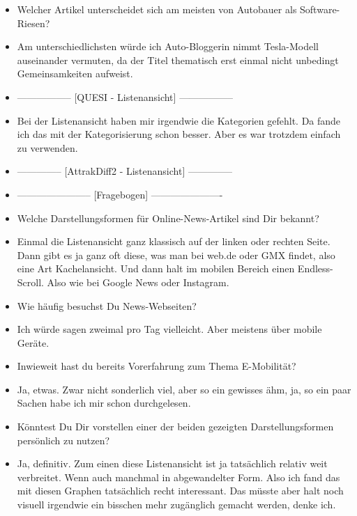 {\begin{itemize}[]
        \item {} Welcher Artikel unterscheidet sich am meisten von \flqq Autobauer als Software-Riesen\frqq{}?
        \item {} Am unterschiedlichsten würde ich \flqq Auto-Bloggerin nimmt Tesla-Modell auseinander\frqq{} vermuten, da der Titel thematisch erst einmal nicht unbedingt Gemeinsamkeiten aufweist.
        \item {-----------------} [QUESI - Listenansicht] {-----------------}
        \item {} Bei der Listenansicht haben mir irgendwie die Kategorien gefehlt.
              Da fande ich das mit der Kategorisierung schon besser.
              Aber es war trotzdem einfach zu verwenden.
        \item {--------------} [AttrakDiff2 - Listenansicht] {--------------}
        \item {-----------------------} [Fragebogen] {----------------------}
        \item {} Welche Darstellungsformen für Online-News-Artikel sind Dir bekannt?
        \item {} Einmal die Listenansicht ganz klassisch auf der linken oder rechten Seite.
        Dann gibt es ja ganz oft diese, was man bei web.de oder GMX findet, also eine Art Kachelansicht.
        Und dann halt im mobilen Bereich einen Endless-Scroll.
        Also wie bei Google News oder Instagram.
        \item {} Wie häufig besuchst Du News-Webseiten?
        \item {} Ich würde sagen zweimal pro Tag vielleicht. Aber meistens über mobile Geräte.
        \item {} Inwieweit hast du bereits Vorerfahrung zum Thema E-Mobilität?
        \item {} Ja, etwas. Zwar nicht sonderlich viel, aber so ein gewisses ähm, ja, so ein paar Sachen habe ich mir schon durchgelesen.
        \item {} Könntest Du Dir vorstellen einer der beiden gezeigten Darstellungsformen persönlich zu nutzen?
        \item {} Ja, definitiv. Zum einen diese Listenansicht ist ja tatsächlich relativ weit verbreitet.
        Wenn auch manchmal in abgewandelter Form.
        Also ich fand das mit diesen Graphen tatsächlich recht interessant.
        Das müsste aber halt noch visuell irgendwie ein bisschen mehr zugänglich gemacht werden, denke ich.

\end{itemize}}
